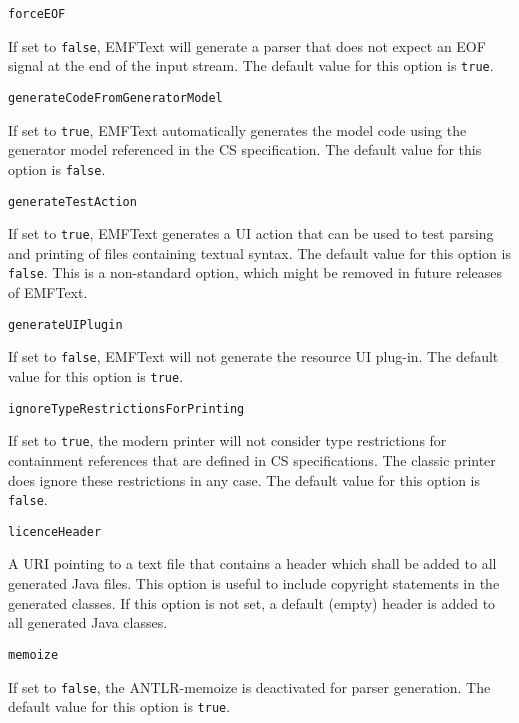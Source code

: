 \noindent\texttt{forceEOF}
\begin{myindentpar}{1cm}
If set to \texttt{false}, EMFText will generate a parser that does not expect an EOF signal at the end of the input stream. The default value for this option is \texttt{true}.
\end{myindentpar}

\noindent\texttt{generateCodeFromGeneratorModel}
\begin{myindentpar}{1cm}
If set to \texttt{true}, EMFText automatically generates the model code using the generator model referenced in the CS specification. The default value for this option is \texttt{false}.
\end{myindentpar}

\noindent\texttt{generateTestAction}
\begin{myindentpar}{1cm}
If set to \texttt{true}, EMFText generates a UI action that can be used to test parsing and printing of files containing textual syntax. The default value for this option is \texttt{false}. This is a non-standard option, which might be removed in future releases of EMFText.
\end{myindentpar}

\noindent\texttt{generateUIPlugin}
\begin{myindentpar}{1cm}
If set to \texttt{false}, EMFText will not generate the resource UI plug-in. The default value for this option is \texttt{true}.
\end{myindentpar}

\noindent\texttt{ignoreTypeRestrictionsForPrinting}
\begin{myindentpar}{1cm}
If set to \texttt{true}, the modern printer will not consider type restrictions for containment references that are defined in CS specifications. The classic printer does ignore these restrictions in any case. The default value for this option is \texttt{false}.
\end{myindentpar}

\noindent\texttt{licenceHeader}
\begin{myindentpar}{1cm}
A URI pointing to a text file that contains a header which shall be added to all generated Java files. This option is useful to include copyright statements in the generated classes. If this option is not set, a default (empty) header is added to all generated Java classes.
\end{myindentpar}

\noindent\texttt{memoize}
\begin{myindentpar}{1cm}
If set to \texttt{false}, the ANTLR-memoize is deactivated for parser generation. The default value for this option is \texttt{true}.
\end{myindentpar}


